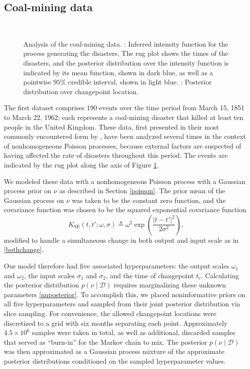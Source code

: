 \documentclass{article}
\newcommand{\deq}{\triangleq}
\newcommand{\psff}[1]{\texttt{[image: figures/\#1.eps]}}
\newcommand{\cm}[1]{\mathcal{#1}}
\newcommand{\data}{\cm{D}}
\newcommand{\given}{\mid}
\begin{document}
\subsection{Coal-mining data}

\begin{figure}
  \centering
  \subfloat[][]{
    \psff{posterior}
    \label{posterior}
  }
  \\
  \subfloat[][]{
    \psff{changepoint}
    \label{changepoint}
  }
  \caption{Analysis of the coal-mining data.  :
    Inferred intensity function for the process generating the
    disasters.  The rug plot shows the times of the disasters, and the
    posterior distribution over the intensity function is indicated by
    its mean function, shown in dark blue, as well as a pointwise
    $95$\% credible interval, shown in light blue.
    : Posterior distribution over changepoint
    location.  }
  \label{coal}
\end{figure}

The first dataset comprises 190 events over the time period from March
15, 1851 to March 22, 1962; each represents a coal-mining disaster
that killed at least ten people in the United Kingdom.  These data,
first presented in their most commonly encountered form by
\citet{jarrett}, have been analyzed several times in the context of
nonhomogeneous Poisson processes, because external factors are
suspected of having affected the rate of disasters throughout this
period.  The events are indicated by the rug plot along the axis of
Figure \ref{coal}.

We modeled these data with a nonhomogeneous Poisson process with a
Gaussian process prior on $\nu$ as described in Section \ref{poisson}.
The prior mean of the Gaussian process on $\nu$ was taken to be the
constant zero function, and the covariance function was chosen to be
the squared exponential covariance function
\begin{equation}
  \label{sqdexp}
  K_{\text{SE}}(t, t'; \omega, \sigma)
  \deq
  \omega^2
  \exp
  \left(
  \frac{ \lvert t - t' \rvert^2}{2\sigma^2}
  \right),
\end{equation}
modified to handle a simultaneous change in both output and input
scale as in \eqref{bothchange}.

Our model therefore had five associated hyperparameters: the output
scales $\omega_1$ and $\omega_2$, the input scales $\sigma_1$ and
$\sigma_2$, and the time of changepoint $t_c$.  Calculating the
posterior distribution $p(\nu \given \data)$ requires marginalizing
these unknown parameters \eqref{nuposterior}.  To accomplish this, we
placed noninformative priors on all five hyperparameters and sampled
from their joint posterior distribution via slice sampling.  For
convenience, the allowed changepoint locations were discretized to a
grid with six months separating each point.  Approximately $4.5 \times
10^6$ samples were taken in total, as well as additional, discarded
samples that served as ``burn-in'' for the Markov chain to mix.  The
posterior $p(\nu \given \data)$ was then approximated as a Gaussian
process mixture of the approximate posterior distributions conditioned
on the sampled hyperparameter values.
\end{document}
